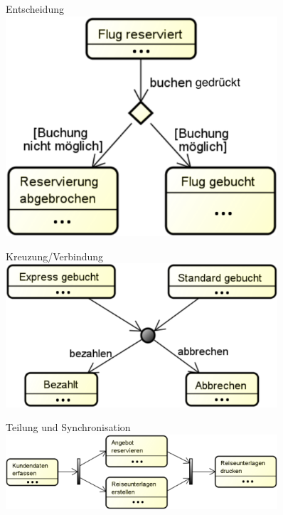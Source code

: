 \documentclass[11pt, a4paper]{article}
\begin{document}
\vspace{1em}

\begin{figure}[ht]
    \centering
    \begin{minipage}[t]{0.30\textwidth}
        \centering Entscheidung \\
        \vspace{1em}
        \centering \includegraphics[width=0.9\textwidth]{Zustand-Elemente/5.png}
    \end{minipage}
    \centering
    \begin{minipage}[t]{0.30\textwidth}
        \centering Kreuzung/Verbindung \\
        \vspace{1em}
        \centering \includegraphics[width=0.9\textwidth]{Zustand-Elemente/6.png}
    \end{minipage}
    \centering
    \begin{minipage}[t]{0.30\textwidth}
        \centering Teilung und Synchronisation \\
        \vspace{1em}
        \centering \includegraphics[width=0.9\textwidth]{Zustand-Elemente/7.png}
    \end{minipage}
\end{figure}
\end{document}
